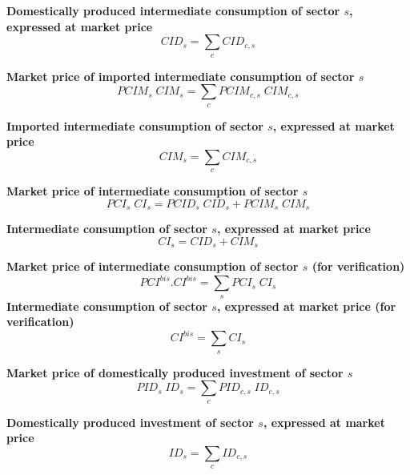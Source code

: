 \documentclass[12pt]{article}
\numberwithin{equation}{section}
\begin{document}
\noindent \textbf{Domestically produced intermediate consumption of sector $s$, expressed at market price} 
\begin{dmath}
CID_{s} = \sum_{c} CID_{c, s}
\label{SU.mdlCID[s]}
\end{dmath}

\noindent \textbf{Market price of imported intermediate consumption of sector $s$} 
\begin{dmath}
PCIM_{s} \; CIM_{s} = \sum_{c} PCIM_{c, s} \; CIM_{c, s}
\label{SU.mdlPCIM[s]}
\end{dmath}

\noindent \textbf{Imported intermediate consumption of sector $s$, expressed at market price} 
\begin{dmath}
CIM_{s} = \sum_{c} CIM_{c, s}
\label{SU.mdlCIM[s]}
\end{dmath}

\noindent \textbf{Market price of intermediate consumption of sector $s$} 
\begin{dmath}
PCI_{s} \; CI_{s} = PCID_{s} \; CID_{s} + PCIM_{s} \; CIM_{s}
\label{SU.mdlPCI[s]}
\end{dmath}

\noindent \textbf{Intermediate consumption of sector $s$, expressed at market price} 
\begin{dmath}
CI_{s} = CID_{s} + CIM_{s}
\label{SU.mdlCI[s]}
\end{dmath}

\noindent \textbf{Market price of intermediate consumption of sector $s$ (for verification)} 
\begin{dmath}
PCI^{bis} . CI^{bis} = \sum_{s} PCI_{s} \; CI_{s}
\label{SU.mdlPCIbis}
\end{dmath}
\noindent \textbf{Intermediate consumption of sector $s$, expressed at market price (for verification)} 
\begin{dmath}
CI^{bis} = \sum_{s} CI_{s}
\label{SU.mdlCIbis}
\end{dmath}

\noindent \textbf{Market price of domestically produced investment of sector $s$} 
\begin{dmath}
PID_{s} \; ID_{s} = \sum_{c} PID_{c, s} \; ID_{c, s}
\label{SU.mdlPID[s]}
\end{dmath}

\noindent \textbf{Domestically produced investment of sector $s$, expressed at market price} 
\begin{dmath}
ID_{s} = \sum_{c} ID_{c, s}
\label{SU.mdlID[s]}
\end{dmath}
\end{document}

